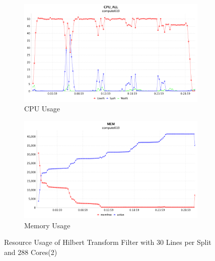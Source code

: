\begin{figure}[h]
\centering
\begin{subfigure}{1\textwidth}
  \centering
  \includegraphics[width=1\linewidth]{figures/Htf30_288_CPU2.png}
  \caption{CPU Usage}
  \label{Htf30_288_CPU2}
\end{subfigure}
\begin{subfigure}{1\textwidth}
  \centering
  \includegraphics[width=1\linewidth]{figures/Htf30_288_MEM2.png}
  \caption{Memory Usage}
  \label{Htf30_288_MEM2}
\end{subfigure}
\caption{Resource Usage of Hilbert Transform Filter with 30 Lines per Split and 288 Cores(2)}
\label{Htf30_288_2}
\end{figure}


